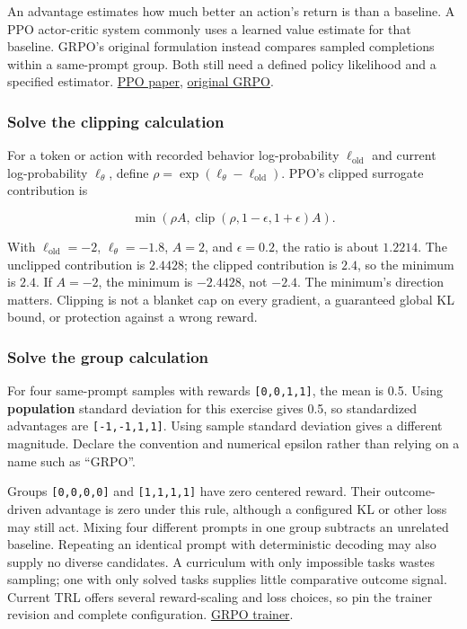 \documentclass[
  11pt,
  letterpaper,
]{article}
\begin{document}
An advantage estimates how much better an action's return is than a
baseline. A PPO actor-critic system commonly uses a learned value
estimate for that baseline. GRPO's original formulation instead compares
sampled completions within a same-prompt group. Both still need a
defined policy likelihood and a specified estimator.
\href{https://arxiv.org/pdf/1707.06347}{PPO paper},
\href{https://arxiv.org/html/2402.03300v3}{original GRPO}.

\subsubsection{Solve the clipping
calculation}\label{solve-the-clipping-calculation}

For a token or action with recorded behavior log-probability
\(\ell_{\mathrm{old}}\) and current log-probability \(\ell_\theta\),
define \(\rho=\exp(\ell_\theta-\ell_{\mathrm{old}})\). PPO's clipped
surrogate contribution is

\[\min\!\left(\rho A,\operatorname{clip}(\rho,1-\epsilon,1+\epsilon)A\right).\]

With \(\ell_{\mathrm{old}}=-2\), \(\ell_\theta=-1.8\), \(A=2\), and
\(\epsilon=0.2\), the ratio is about \(1.2214\). The unclipped
contribution is \(2.4428\); the clipped contribution is \(2.4\), so the
minimum is \(2.4\). If \(A=-2\), the minimum is \(-2.4428\), not
\(-2.4\). The minimum's direction matters. Clipping is not a blanket cap
on every gradient, a guaranteed global KL bound, or protection against a
wrong reward.

\subsubsection{Solve the group
calculation}\label{solve-the-group-calculation}

For four same-prompt samples with rewards \texttt{{[}0,0,1,1{]}}, the
mean is 0.5. Using \textbf{population} standard deviation for this
exercise gives 0.5, so standardized advantages are
\texttt{{[}-1,-1,1,1{]}}. Using sample standard deviation gives a
different magnitude. Declare the convention and numerical epsilon rather
than relying on a name such as ``GRPO''.

Groups \texttt{{[}0,0,0,0{]}} and \texttt{{[}1,1,1,1{]}} have zero
centered reward. Their outcome-driven advantage is zero under this rule,
although a configured KL or other loss may still act. Mixing four
different prompts in one group subtracts an unrelated baseline.
Repeating an identical prompt with deterministic decoding may also
supply no diverse candidates. A curriculum with only impossible tasks
wastes sampling; one with only solved tasks supplies little comparative
outcome signal. Current TRL offers several reward-scaling and loss
choices, so pin the trainer revision and complete configuration.
\href{https://huggingface.co/docs/trl/main/en/grpo_trainer}{GRPO
trainer}.
\end{document}
